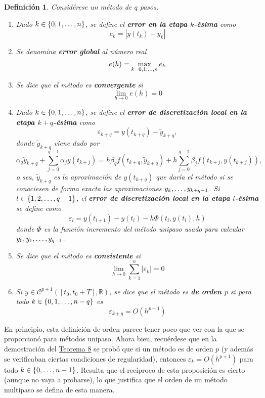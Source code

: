 \documentclass[11pt]{report}
\theoremstyle{mytheorem}
\theoremstyle{mydefinition}
\newtheorem{definition}{Definición}
\theoremstyle{myexample}
\newenvironment{cdefinition} %
  {\begin{mdframed}[
        linewidth=3pt,
        linecolor=c1,
        bottomline=false,
        topline=false,
        rightline=false,
        innerrightmargin=0pt,
        innertopmargin=0pt,
        innerbottommargin=0pt,
        innerleftmargin=1em, %
        skipabove=\baselineskip]
    \begin{definition}}
  {\end{definition}\end{mdframed}}
\newcommand{\R}{\mathbb R}
\newcommand{\mybf}[1]{\boldmath\textbf{\color{c1}#1}\unboldmath}
\begin{document}
\begin{cdefinition}
Considérese un método de $q$ pasos.
\begin{enumerate}
    \item Dado $k \in \{0,1,\mathellipsis,n\}$, se define el \mybf{error en la etapa $k$-ésima} como
    \[e_k=|y(t_k)-y_k|\]
    \item Se denomina \mybf{error global} al número real
    \[e(h) = \max_{k=0,1,\mathellipsis,n} e_k\]
    \item Se dice que el método es \mybf{convergente} si
    \[\lim_{h \to 0}e(h) =0\]
    \item  Dado $k \in \{0,1,\mathellipsis,n\}$, se define el \mybf{error de discretización local en la etapa $k+q$-ésima} como
    \[\varepsilon_{k+q} = y(t_{k+q})-\widetilde{y}_{k+q},\]
    donde $\widetilde{y}_{k+q}$ viene dado por
    \[\alpha_q\widetilde{y}_{k+q} +\sum_{j=0}^{q-1}\alpha_jy(t_{k+j}) = h\beta_qf(t_{k+q},\widetilde{y}_{k+q})+h\sum_{j=0}^{q-1}\beta_jf(t_{k+j},y(t_{k+j})),\]
    o sea, $\widetilde{y}_{k+q}$ es la aproximación de $y(t_{k+q})$ que daría el método si se conociesen de forma exacta las aproximaciones $y_k,\mathellipsis,y_{k+q-1}$. Si $l \in \{1,2,\mathellipsis,q-1\}$, el \mybf{error de discretización local en la etapa $l$-ésima} se define como
    \[\varepsilon_l = y(t_{l+1})-y(t_l)-h\Phi(t_l,y(t_l),h)\]
    donde $\Phi$ es la función incremento del método unipaso usado para calcular $y_0,y_1,\mathellipsis,y_{q-1}$.
    \item Se dice que el método es \mybf{consistente} si
    \[\lim_{h \to 0} \sum_{k=1}^n |\varepsilon_k| = 0\]
    \item Si $y \in \mathcal{C}^{p+1}([t_0,t_0+T],\R)$, se dice que el método es \mybf{de orden $p$} si para todo $k \in \{0,1,\mathellipsis,n-q\}$ es
    \[\varepsilon_{k+q} = O(h^{p+1})\]
\end{enumerate}
\end{cdefinition}

\vspace{\parskip}

En principio, esta definición de orden parece tener poco que ver con la que se proporcionó para métodos unipaso. Ahora bien, recuérdese que en la demostración del \hyperref[teo2.17]{\color{gray}Teorema 8} se probó que si un método es de orden $p$ (y además se verificaban ciertas condiciones de regularidad), entonces $\varepsilon_{k} = O(h^{p+1})$ para todo $k \in \{0,\mathellipsis,n-1\}$. Resulta que el recíproco de esta proposición es cierto (aunque no vaya a probarse), lo que justifica que el orden de un método multipaso se defina de esta manera.
\end{document}
